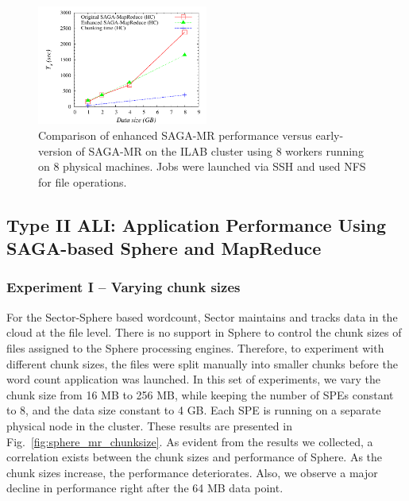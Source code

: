 \documentclass[3p,twocolumn]{elsarticle}
\begin{document}
\begin{figure}[htb!]
 \includegraphics[width=0.5\textwidth]{figures/sagamr_comparison.pdf}
 \caption{
   Comparison of enhanced SAGA-MR performance versus
   early-version of SAGA-MR on the ILAB cluster using 8 workers running on 8
   physical machines. Jobs were launched via SSH and used NFS for file
   operations.
   \label{fig:sagamr_comparison}
   }
\end{figure}


\subsection{Type II ALI: Application Performance Using SAGA-based
Sphere and MapReduce}

\subsubsection{Experiment I -- Varying chunk sizes} 

For the Sector-Sphere based wordcount, Sector maintains and tracks
data in the cloud at the file level. There is no support in Sphere to
control the chunk sizes of files assigned to the Sphere processing
engines. Therefore, to experiment with different chunk sizes, the
files were split manually into smaller chunks before the word count
application was launched. In this set of experiments, we vary the
chunk size from 16 MB to 256 MB, while keeping the number of SPEs
constant to 8, and the data size constant to 4 GB. Each SPE is running
on a separate physical node in the cluster. These results are
presented in Fig.~\ref{fig:sphere_mr_chunksize}.
As evident from the results we collected, a
correlation exists between the chunk sizes and performance of Sphere.
As the chunk sizes increase, the performance deteriorates. Also, we
observe a major decline in performance right after the 64 MB data
point. 
\end{document}
